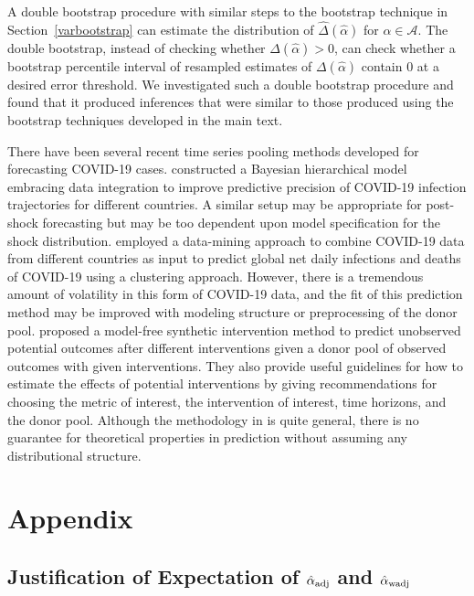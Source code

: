 \documentclass[11pt]{article}
\def\mc#1{\mathcal{#1}} %
\theoremstyle{definition}
\begin{document}
A double bootstrap procedure with similar steps to the bootstrap technique in Section~\ref{varbootstrap} can estimate the distribution of $\hat\Delta(\hat{\alpha})$ for $\hat{\alpha} \in \mc{A}$. The double bootstrap, instead of checking whether $\Delta(\hat{\alpha})>0$, can check whether a bootstrap percentile interval of resampled estimates of $\Delta(\hat{\alpha})$ contain 0 at a desired error threshold. We investigated such a double bootstrap procedure and found that it produced inferences that were similar to those produced using the bootstrap techniques developed in the main text. 


There have been several recent time series pooling methods developed for forecasting COVID-19 cases. \citet{lee2020estimation} constructed a Bayesian hierarchical model embracing data integration to improve predictive precision of COVID-19 infection trajectories for different countries. A similar setup may be appropriate for post-shock forecasting but may be too dependent upon model specification for the shock distribution. \citet{plessen2020integrated} employed a data-mining approach to combine COVID-19 data from different countries as input to predict global net daily infections and deaths of COVID-19 using a clustering approach. However, there is a tremendous amount of volatility in this form of COVID-19 data, and the fit of this prediction method may be improved with modeling structure or preprocessing of the donor pool. \citet{agarwal2020two} proposed a model-free synthetic intervention method to predict unobserved potential outcomes after different interventions given a donor pool of observed outcomes with given interventions. They also provide useful guidelines for how to estimate the effects of potential interventions by giving recommendations for choosing the metric of interest, the intervention of interest, time horizons, and the donor pool. Although the methodology in \citet{agarwal2020two} is quite general, there is no guarantee for theoretical properties in prediction without assuming any distributional structure.


\section{Appendix}
\label{proofs}

\subsection{Justification of Expectation of $\hat{\alpha}_{\rm adj}$ and $\hat{\alpha}_{\rm wadj}$}
\label{exp}
\end{document}
